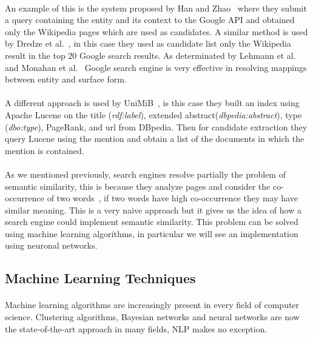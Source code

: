 \paragraph{}
An example of this is the system proposed by Han and Zhao~\cite{han2009nlpr_kbp} where they submit a query containing the entity and its context to the Google API and obtained only the Wikipedia pages which are used as candidates. A similar method is used by Dredze et al.~\cite{dredze2010entity}, in this case they used as candidate list only the Wikipedia result in the top 20 Google search results. As determinated by Lehmann et al.~\cite{lehmann2010lcc} and Monahan et al.~\cite{monahan2011cross} Google search engine is very effective in resolving mappings between entity and surface form.

\paragraph{}
A different approach is used by UniMiB~\cite{caliano2016unimib}, is this case they built an index using Apache Lucene on the title (\textit{rdf:label}), extended abstract\break(\textit{dbpedia:abstract}), type (\textit{dbo:type}), PageRank, and url from DBpedia. Then for candidate extraction they query Lucene using the mention and obtain a list of the documents in which the mention is contained.

\paragraph{}
As we mentioned previously, search engines resolve partially the problem of semantic similarity, this is because they analyze pages and consider the co-occurrence of two words~\cite{bollegala2007measuring}, if two words have high co-occurrence they may have similar meaning. This is a very naive approach but it gives us the idea of how a search engine could implement semantic similarity. This problem can be solved using machine learning algorithms, in particular we will see an implementation using neuronal networks. 

\subsection{Machine Learning Techniques}
\paragraph{}
Machine learning algorithms are increasingly present in every field of computer science. Clustering algorithms, Bayesian networks and neural networks are now the state-of-the-art approach in many fields, NLP makes no exception.

